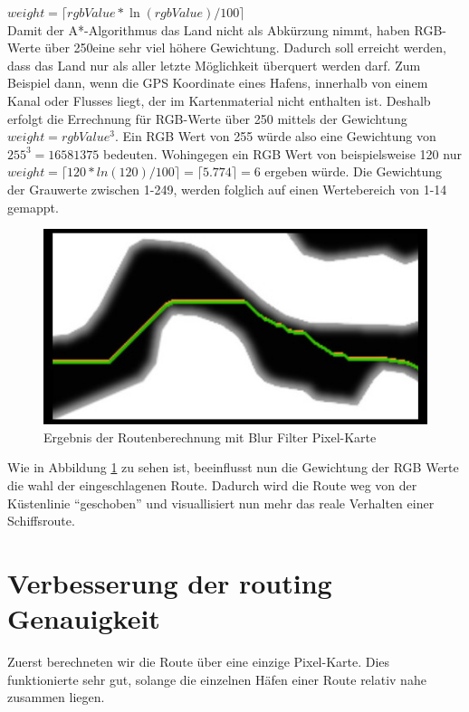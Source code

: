 \documentclass[letterpaper]{article}
\begin{document}
			$weight = \lceil rgbValue * \ln{(rgbValue)/100} \rceil$\\

			Damit der A*-Algorithmus das Land nicht als Abkürzung nimmt, haben RGB-Werte über 250\footnotemark eine sehr viel höhere Gewichtung. Dadurch soll erreicht werden, dass das Land nur als aller letzte Möglichkeit überquert werden darf. Zum Beispiel dann, wenn die GPS Koordinate eines Hafens, innerhalb von einem Kanal oder Flusses liegt, der im Kartenmaterial nicht enthalten ist. Deshalb erfolgt die Errechnung für RGB-Werte über 250 mittels der Gewichtung $weight = rgbValue^3$. Ein RGB Wert von 255 würde also eine Gewichtung von $255^3 = 16581375$ bedeuten. Wohingegen ein RGB Wert von beispielsweise 120 nur $ weight = \lceil 120 * ln(120)/100 \rceil = \lceil 5.774 \rceil = 6 $ ergeben würde. Die Gewichtung der Grauwerte zwischen 1-249, werden folglich auf einen Wertebereich von 1-14 gemappt.\\


			\begin{figure}[!htbp]
				\centering
				\includegraphics[width=0.7\linewidth]{route_after_blur}
				\caption{Ergebnis der Routenberechnung mit Blur Filter Pixel-Karte}
				\label{fig:route_after_blur}
			\end{figure}

			Wie in Abbildung \ref{fig:route_after_blur} zu sehen ist, beeinflusst nun die Gewichtung der RGB Werte die wahl der eingeschlagenen Route. Dadurch wird die Route weg von der Küstenlinie "`geschoben"' und visuallisiert nun mehr das reale Verhalten einer Schiffsroute.

\section{Verbesserung der routing Genauigkeit}
	Zuerst berechneten wir die Route über eine einzige Pixel-Karte. Dies funktionierte sehr gut, solange die einzelnen Häfen einer Route relativ nahe zusammen liegen.
\end{document}
